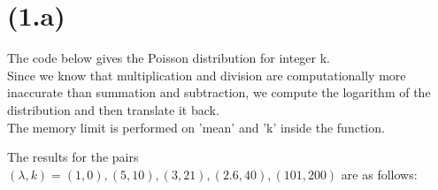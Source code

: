 \section{(1.a)}

The code below gives the Poisson distribution for integer k.\\
Since we know that multiplication and division are computationally more inaccurate than summation and subtraction, we compute the logarithm of the distribution and then translate it back.\\
The memory limit is performed on 'mean' and 'k' inside the function.



The results for the pairs $(\lambda, k)= (1,0) , (5,10) ,  (3,21) , (2.6,40), (101,200)$ are as follows:


